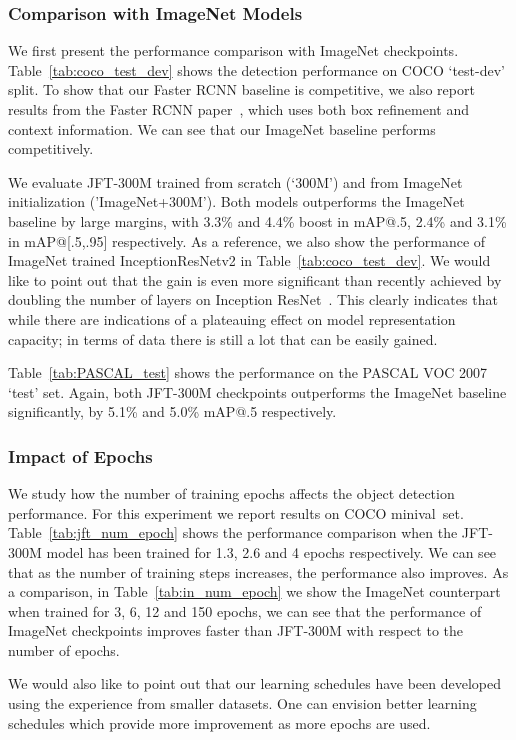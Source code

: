 \documentclass[10pt,twocolumn,letterpaper]{article}
\newcommand{\minival}{minival\raisebox{0.2ex}{$\ast$}}
\begin{document}
\subsubsection*{Comparison with ImageNet Models}
We first present the performance comparison with ImageNet checkpoints. Table~\ref{tab:coco_test_dev} shows the detection performance on COCO `test-dev' split. To show that our Faster RCNN baseline is competitive,
we also report results from the Faster RCNN paper~\cite{he2016resnet}, which uses both box refinement and context information. We can see that our ImageNet baseline performs competitively.

We evaluate JFT-300M trained from scratch (`300M') and from ImageNet initialization ('ImageNet+300M'). Both models outperforms the ImageNet baseline by large margins, with 3.3\% and 4.4\% boost in mAP@.5, 2.4\% and 3.1\% in mAP@[.5,.95] respectively. As a reference, we also show the performance of ImageNet trained InceptionResNetv2 in Table~\ref{tab:coco_test_dev}. We would like to point out that the gain is even more significant than recently achieved by doubling the number of layers on Inception ResNet~\cite{Google_FRCNN}. This clearly indicates that while there are indications of a plateauing effect on model representation capacity; in terms of data there is still a lot that can be easily gained.

Table~\ref{tab:PASCAL_test} shows the performance on the PASCAL VOC 2007 `test' set. Again, both JFT-300M checkpoints outperforms the ImageNet baseline significantly, by 5.1\% and 5.0\% mAP@.5 respectively.

\subsubsection*{Impact of Epochs}
We study how the number of training epochs affects the object detection performance. For this experiment we report results on COCO \minival\ set. Table~\ref{tab:jft_num_epoch} shows the performance comparison when the JFT-300M model has been trained for 1.3, 2.6 and 4 epochs respectively. We can see that as the number of training steps increases, the performance also improves. As a comparison, in Table~\ref{tab:in_num_epoch} we show the ImageNet counterpart when trained for 3, 6, 12 and 150 epochs, we can see that the
performance of ImageNet checkpoints improves faster than JFT-300M with respect to the number of epochs. 

We would also like to point out that our learning schedules have been developed using the experience from smaller datasets. One can envision better learning schedules which provide more improvement as more epochs are used.
\end{document}
